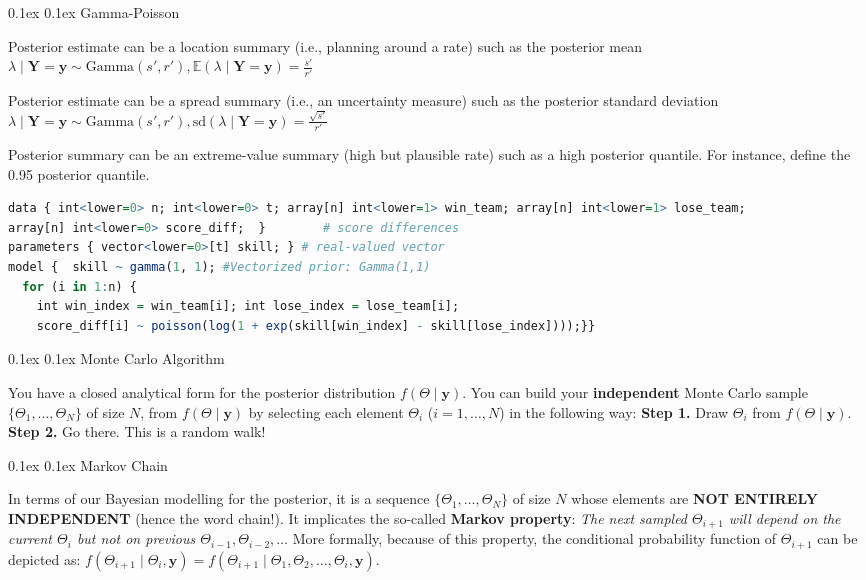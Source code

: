 \documentclass[8pt,landscape]{article}
\makeatletter
\renewcommand{\section}{\@startsection{section}{2}{0pt}%
    {0.1ex}%
    {0.1ex}%
    {\fontsize{8}{9}\bfseries\color{red}}} %
\newcommand{\smalltext}[1]{
  {\fontsize{8}{9}\selectfont\sloppy #1\par}
}
\makeatother
\begin{document}
\begin{multicols}{3}
\section{Gamma-Poisson}
\smalltext{
  Posterior estimate can be a location summary (i.e., planning around a
  rate) such as the posterior mean $\lambda \mid \mathbf{Y} = \mathbf{y} \sim \text{Gamma}(s', r'), \mathbb{E}(\lambda \mid \mathbf{Y} = \mathbf{y}) = \frac{s'}{r'}$

  Posterior estimate can be a spread summary (i.e., an uncertainty measure)
such as the posterior standard deviation  $\lambda \mid \mathbf{Y} = \mathbf{y} \sim \text{Gamma}(s', r'), \text{sd}(\lambda \mid \mathbf{Y} = \mathbf{y}) = \frac{\sqrt{s'}}{r'}$

 Posterior summary can be an extreme-value summary (high but plausible rate) such as a high posterior quantile. For instance, define the 0.95 posterior quantile.
}
\begin{lstlisting}[language=R]
data { int<lower=0> n; int<lower=0> t; array[n] int<lower=1> win_team; array[n] int<lower=1> lose_team;
array[n] int<lower=0> score_diff;  }        # score differences
parameters { vector<lower=0>[t] skill; } # real-valued vector
model {  skill ~ gamma(1, 1); #Vectorized prior: Gamma(1,1)
  for (i in 1:n) {            
    int win_index = win_team[i]; int lose_index = lose_team[i]; 
    score_diff[i] ~ poisson(log(1 + exp(skill[win_index] - skill[lose_index])));}}
\end{lstlisting}


\section{Monte Carlo Algorithm}
\smalltext{
  You have a closed analytical form for the posterior distribution $f(\Theta \mid \mathbf{y})$. You can build your \textbf{independent} Monte Carlo sample $\{\Theta_1, \dots, \Theta_N\}$ of size $N$, from $f(\Theta \mid \mathbf{y})$ by selecting each element $\Theta_i$ ($i = 1, \dots, N$) in the following way:
\textbf{Step 1.} Draw $\Theta_i$ from $f(\Theta \mid \mathbf{y})$.
     \textbf{Step 2.} Go there.  
  This is a random walk!
}

\section{Markov Chain}
\smalltext{
  In terms of our Bayesian modelling for the posterior, it is a sequence $\{\Theta_1, \dots, \Theta_N\}$ of size $N$ whose elements are \textbf{NOT ENTIRELY INDEPENDENT} (hence the word chain!).
 It implicates the so-called \textbf{Markov property}:
    \textit{The next sampled $\Theta_{i+1}$ will depend on the current $\Theta_i$ but not on previous $\Theta_{i-1}, \Theta_{i-2}, \dots$}
More formally, because of this property, the conditional probability function of $\Theta_{i+1}$ can be depicted as:
$f(\Theta_{i+1} \mid \Theta_i, \mathbf{y}) = f(\Theta_{i+1} \mid \Theta_1, \Theta_2, \dots, \Theta_i, \mathbf{y}).$
}


\end{multicols}
\end{document}
